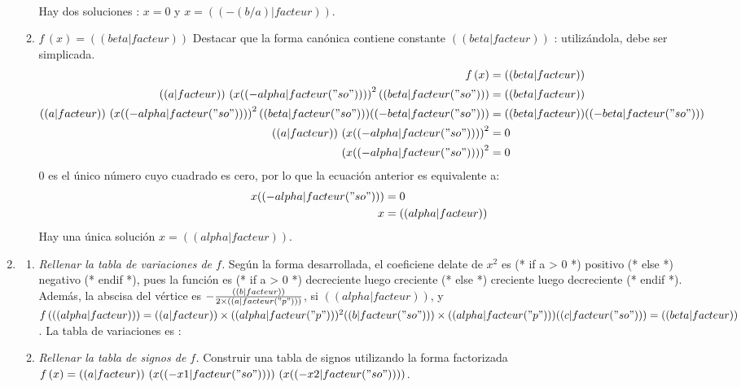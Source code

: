 \begin{enumerate}
\begin{enumerate}
\begin{align*}
\end{align*}
Hay dos soluciones : $x=0$ y $x=(( -(b/a)|facteur ))$.
\item $f\,(x)=(( beta|facteur ))$ Destacar que la forma canónica contiene constante $(( beta|facteur ))$ : utilizándola, debe ser simplicada.
\begin{align*}
f\,(x) &= (( beta|facteur)) \\
(( a|facteur )) \,\left( x (( -alpha|facteur("so") )) \right)^2 (( beta|facteur("so") )) &= (( beta|facteur ))\\
(( a|facteur )) \,\left( x (( -alpha|facteur("so") )) \right)^2 (( beta|facteur("so") )) (( -beta|facteur("so") )) &= (( beta|facteur )) (( -beta|facteur("so") ))\\
(( a|facteur )) \,\left( x (( -alpha|facteur("so") )) \right)^2 &= 0\\
\left( x (( -alpha|facteur("so") )) \right)^2 &= 0\\
\end{align*}
$0$ es el único número cuyo cuadrado es cero, por lo que la ecuación anterior es equivalente a:
\begin{align*}
x (( -alpha|facteur("so") )) &= 0\\
x &= (( alpha|facteur )) \\
\end{align*}
Hay una única solución $x=(( alpha|facteur ))$.
\end{enumerate}
\item
\begin{enumerate}
\item \emph{Rellenar la tabla de variaciones de $f$.} Según la forma desarrollada, el coeficiene delate de $x^2$ es 
(* if a > 0 *) positivo (* else *) negativo (* endif *),
pues la función es 
(* if a > 0 *) decreciente luego creciente (* else *) creciente luego decreciente (* endif *).
Además, la abscisa del vértice es $-\frac{(( b|facteur ))}{2\times{}(( a|facteur("p") ))}$, si $(( alpha|facteur ))$, y
$f\,( (( alpha|facteur )) )=(( a|facteur ))\times{}(( alpha|facteur("p") ))^2 (( b|facteur("so") ))\times{} (( alpha|facteur("p") )) (( c|facteur("so") ))=(( beta|facteur ))$.
La tabla de variaciones es :
\begin{center}
\end{center}
\item \emph{Rellenar la tabla de signos de $f$.} Construir una tabla de signos utilizando la forma factorizada $f\,(x)=(( a|facteur )) \,\left(x (( -x1|facteur("so") ))\right) \, \left(x (( -x2|facteur("so") ))\right)$.


\end{enumerate}
\end{enumerate}
